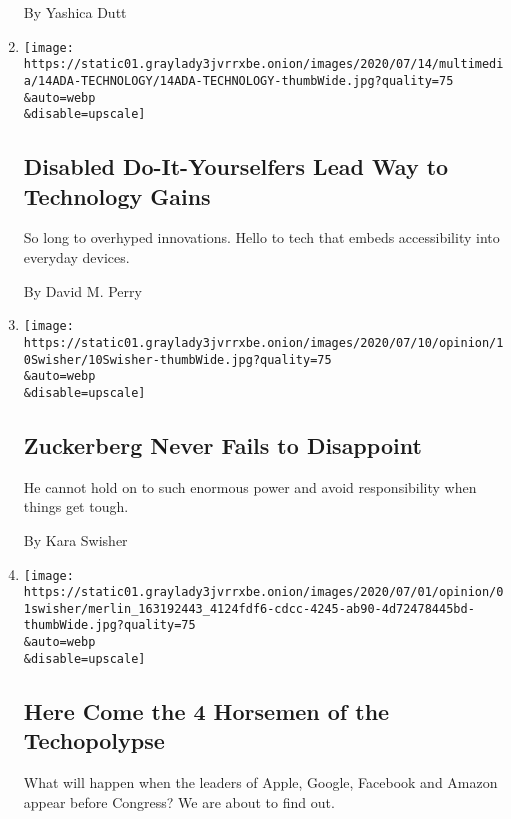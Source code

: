 \begin{enumerate}
  By Yashica Dutt
\item
  \href{/2020/07/14/style/assistive-technology.html}{}

  \texttt{[image: https://static01.graylady3jvrrxbe.onion/images/2020/07/14/multimedia/14ADA-TECHNOLOGY/14ADA-TECHNOLOGY-thumbWide.jpg?quality=75\\\&auto=webp\\\&disable=upscale]}

  \hypertarget{disabled-do-it-yourselfers-lead-way-to-technology-gains}{%
  \subsection{Disabled Do-It-Yourselfers Lead Way to Technology
  Gains}\label{disabled-do-it-yourselfers-lead-way-to-technology-gains}}

  So long to overhyped innovations. Hello to tech that embeds
  accessibility into everyday devices.

  By David M. Perry
\item
  \href{/2020/07/10/opinion/facebook-zuckerberg.html}{}

  \texttt{[image: https://static01.graylady3jvrrxbe.onion/images/2020/07/10/opinion/10Swisher/10Swisher-thumbWide.jpg?quality=75\\\&auto=webp\\\&disable=upscale]}

  \hypertarget{zuckerberg-never-fails-to-disappoint}{%
  \subsection{Zuckerberg Never Fails to
  Disappoint}\label{zuckerberg-never-fails-to-disappoint}}

  He cannot hold on to such enormous power and avoid responsibility when
  things get tough.

  By Kara Swisher
\item
  \href{/2020/07/01/opinion/anti-trust-tech-hearing-facebook.html}{}

  \texttt{[image: https://static01.graylady3jvrrxbe.onion/images/2020/07/01/opinion/01swisher/merlin\_163192443\_4124fdf6-cdcc-4245-ab90-4d72478445bd-thumbWide.jpg?quality=75\\\&auto=webp\\\&disable=upscale]}

  \hypertarget{here-come-the-4-horsemen-of-the-techopolypse}{%
  \subsection{Here Come the 4 Horsemen of the
  Techopolypse}\label{here-come-the-4-horsemen-of-the-techopolypse}}

  What will happen when the leaders of Apple, Google, Facebook and
  Amazon appear before Congress? We are about to find out.


\end{enumerate}

